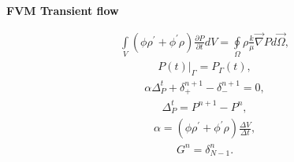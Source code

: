 \documentclass[a4paper,12pt]{extreport}
\begin{document}
\begin{multicols}{2}
        \columnbreak
        \begin{center}
        {\large \textbf{FVM Transient flow}}
        \end{center}
        \begin{eqnarray}
            \label{eq:conductivity_integral}
            \int \limits_{V} \left( \phi \rho^\prime + \phi^\prime \rho \right) \frac{\partial P}{\partial t} d V = \oint \limits_{\Omega} \rho \frac{k}{\mu} \vec{\nabla}P d\vec{\Omega},
        \end{eqnarray}
        \begin{eqnarray}
            \label{eq:conductivity_bound}
            P\left(t\right) \Big|_\Gamma = P_\Gamma\left(t\right),
        \end{eqnarray}
        \begin{eqnarray}
            \label{eq:conductivity_num}
            \alpha \Delta^{t}_{P} + \delta_{+}^{n+1} - \delta_{-}^{n+1} = 0,
        \end{eqnarray}
        \begin{eqnarray}
            \label{eq:delta_P_t_num}
            \Delta^{t}_{P} = P^{n+1} - P^{n},
        \end{eqnarray}
        \begin{eqnarray}
            \label{eq:alpha}
            \alpha = \left( \phi \rho^\prime + \phi^\prime \rho \right) \frac{\Delta V}{\Delta t},
        \end{eqnarray}
        \begin{eqnarray}
            \label{eq:Consumption_conductivity_integral}
            G^n = \delta_{N-1}^{n}.
        \end{eqnarray}
    \end{multicols}

    \vspace{1.cm}
\end{document}
